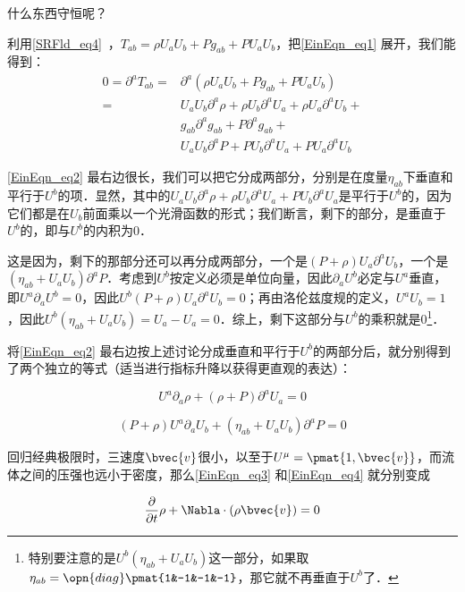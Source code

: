 什么东西守恒呢？

利用\autoref{SRFld_eq4}~，$T_{ab}=\rho U_aU_b+P g_{ab}+P U_aU_b$，把\autoref{EinEqn_eq1} 展开，我们能得到：
\begin{equation}\label{EinEqn_eq2}
\begin{aligned}
0=\partial^aT_{ab}=&\partial^a(\rho U_aU_b+P g_{ab}+P U_aU_b)\\
=&U_aU_b\partial^a\rho+\rho U_b\partial^aU_a+\rho U_a\partial^aU_b+\\
&g_{ab}\partial^ag_{ab}+P\partial^ag_{ab}+\\
&U_aU_b\partial^aP+P U_b\partial^aU_a+P U_a\partial^aU_b
\end{aligned}
\end{equation}

\autoref{EinEqn_eq2} 最右边很长，我们可以把它分成两部分，分别是在度量$\eta_{ab}$下垂直和平行于$U^b$的项．显然，其中的$U_aU_b\partial^a\rho+\rho U_b\partial^aU_a+P U_b\partial^aU_a$是平行于$U^b$的，因为它们都是在$U_b$前面乘以一个光滑函数的形式；我们断言，剩下的部分，是垂直于$U^b$的，即与$U^b$的内积为$0$．

这是因为，剩下的那部分还可以再分成两部分，一个是$(P+\rho)U_a\partial^aU_b$，一个是$(\eta_{ab}+U_aU_b)\partial^aP$．考虑到$U^b$按定义必须是单位向量，因此$\partial_aU^b$必定与$U^a$垂直，即$U^a\partial_aU^b=0$，因此$U^b(P+\rho)U_a\partial^aU_b=0$；再由洛伦兹度规的定义，$U^aU_b=1$，因此$U^b(\eta_{ab}+U_aU_b)=U_a-U_a=0$．综上，剩下这部分与$U^b$的乘积就是$0$\footnote{特别要注意的是$U^b(\eta_{ab}+U_aU_b)$这一部分，如果取$\eta_{ab}=\opn{diag}\pmat{1&-1&-1&-1}$，那它就不再垂直于$U^b$了．}．

将\autoref{EinEqn_eq2} 最右边按上述讨论分成垂直和平行于$U^b$的两部分后，就分别得到了两个独立的等式（适当进行指标升降以获得更直观的表达）：

\begin{equation}\label{EinEqn_eq3}
U^a\partial_a\rho+(\rho+P)\partial^aU_a=0
\end{equation}

\begin{equation}\label{EinEqn_eq4}
(P+\rho)U^a\partial_aU_b+(\eta_{ab}+U_aU_b)\partial^aP=0
\end{equation}

回归经典极限时，三速度$\bvec{v}$很小，以至于$U^\mu=\pmat{1, \bvec{v}}$，而流体之间的压强也远小于密度，那么\autoref{EinEqn_eq3} 和\autoref{EinEqn_eq4} 就分别变成

\begin{equation}\label{EinEqn_eq5}
\frac{\partial}{\partial t}\rho+\Nabla\cdot(\rho\bvec{v})=0
\end{equation}

